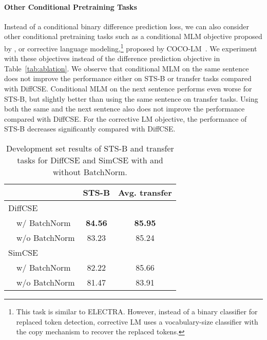\documentclass[11pt]{article}
\newcommand\tf[1]{\textbf{#1}}
\begin{document}
\paragraph{Other Conditional Pretraining Tasks}
Instead of a conditional binary difference prediction loss, we can also consider other conditional pretraining tasks such as a conditional MLM objective proposed by \citet{yang2020universal}, or corrective language modeling,\footnote{This task is similar to ELECTRA. However, instead of a binary classifier for replaced token detection, corrective LM uses a vocabulary-size classifier with the copy mechanism to recover the replaced tokens.} proposed by COCO-LM~\cite{meng2021coco}. We experiment with these objectives instead of the difference prediction objective in Table~\ref{tab:ablation}. We observe that conditional MLM on the same sentence does not improve the performance either on STS-B or transfer tasks compared with DiffCSE.
Conditional MLM on the next sentence performs even worse for STS-B, but slightly better than using the same sentence on transfer tasks. Using both the same and the next sentence also does not improve the performance compared with DiffCSE.
For the corrective LM objective, the performance of STS-B decreases significantly compared with DiffCSE. 


\begin{table}[h!]
    \begin{center}
    \centering
    \small
    \begin{tabular}{lcc}
    \toprule
         & \tf{STS-B} & \tf{Avg. transfer} \\
    \midrule
        DiffCSE & \\
        ~~w/ BatchNorm & \bf 84.56 & \bf 85.95 \\
        ~~w/o BatchNorm & 83.23 & 85.24 \\
    \midrule
        SimCSE & \\
        ~~w/ BatchNorm & 82.22 & 85.66 \\
        ~~w/o BatchNorm & 81.47 & 83.91 \\
    \bottomrule
    \end{tabular}
    \end{center}
\vspace{-2mm}
    \caption{
        Development set results of STS-B and transfer tasks for DiffCSE and SimCSE with and without BatchNorm. 
    }
    \label{tab:bn}
\vspace{-4mm}
\end{table}
\end{document}
